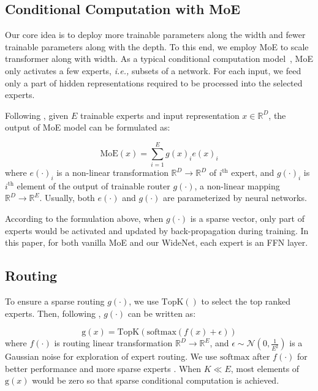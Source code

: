 \documentclass[letterpaper]{article} \usepackage{aaai22}  \usepackage{times}  \usepackage{helvet}  \usepackage{courier}  \usepackage[hyphens]{url}  \usepackage{graphicx} \urlstyle{rm} \def\UrlFont{\rm}  \usepackage{natbib}  \usepackage{caption} \DeclareCaptionStyle{ruled}{labelfont=normalfont,labelsep=colon,strut=off} \frenchspacing  \setlength{\pdfpagewidth}{8.5in}  \setlength{\pdfpageheight}{11in}  \usepackage{algorithm}
\newcommand{\ie}{\emph{i.e.,}\xspace}
\begin{document}
\subsection{Conditional Computation with MoE}



Our core idea is to deploy more trainable parameters along the width and fewer trainable parameters along with the depth. To this end, we employ MoE to scale transformer along with width. As a typical conditional computation model~\citep{bengio2013deep}, MoE only activates a few experts, \ie subsets of a network. For each input, we feed only a part of hidden representations required to be processed into the selected experts. 



Following \citet{shazeer2017outrageously}, given $E$ trainable experts and input representation $x\in \mathbb{R}^D$, the output of MoE model can be formulated as:

\begin{equation}
\mathrm{MoE}(x)=\sum_{i=1}^E {g(x)}_i {e(x)}_i
\end{equation}
where ${e(\cdot)}_i$ is a non-linear transformation $\mathbb{R}^D \to \mathbb{R}^D$ of $i^{\mathrm{th}}$ expert, and ${g(\cdot)}_i$ is $i^{\mathrm{th}}$ element of the output of trainable router $g(\cdot)$, a non-linear mapping $\mathbb{R}^D \to \mathbb{R}^E$. Usually, both $e(\cdot)$ and $g(\cdot)$ are parameterized by neural networks. 

According to the formulation above, when $g(\cdot)$ is a sparse vector, only part of experts would be activated and updated by back-propagation during training. In this paper, for both vanilla MoE and our WideNet, each expert is an FFN layer.






\subsection{Routing}


To ensure a sparse routing $g(\cdot)$, we use $\mathrm{TopK}()$ to select the top ranked experts. Then, following \citet{riquelme2021scaling}, $g(\cdot)$ can be written as:

\begin{equation}\label{eq:topK}
\mathrm{g}(x)=\mathrm{TopK}(\mathrm{softmax}(f(x)+\epsilon))
\end{equation}
where $f(\cdot)$ is routing linear transformation $\mathbb{R}^D \to \mathbb{R}^E$, and $\epsilon \sim \mathcal{N}(0,\frac{1}{E^2})$ is a Gaussian noise for exploration of expert routing. We use $\mathrm{softmax}$ after $f(\cdot)$ for better performance and more sparse experts \citep{riquelme2021scaling,fedus2021switch}. When $K \ll E$, most elements of $\mathrm{g}(x)$ would be zero so that sparse conditional computation is achieved. 
\end{document}

